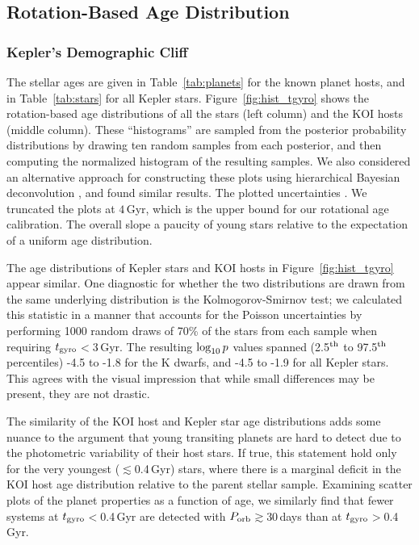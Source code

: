 \documentclass[11pt,twocolumn,tighten]{aastex63}
\begin{document}
\subsection{Rotation-Based Age Distribution}

\subsubsection{Kepler's Demographic Cliff}

The stellar ages are given in Table~\ref{tab:planets} for the known
planet hosts, and in Table~\ref{tab:stars} for all Kepler stars.
Figure~\ref{fig:hist_tgyro} shows the rotation-based age distributions
of all the stars (left column) and the KOI hosts (middle column).
These ``histograms'' are sampled from the posterior probability
distributions by drawing ten random samples from each posterior, and
then computing the normalized histogram of the resulting samples.
We also considered an alternative approach for constructing these
plots using hierarchical Bayesian deconvolution
\citep{Masuda2022infer}, and found similar results.  The plotted
uncertainties .  We truncated the plots
at $4$\,Gyr, which is the upper bound for our
rotational age calibration.  The overall slope  a paucity of
young stars relative to the expectation of a uniform age distribution.

The age distributions of Kepler stars and KOI hosts in
Figure~\ref{fig:hist_tgyro} appear similar.  One diagnostic for
whether the two distributions are drawn from the same underlying
distribution is the Kolmogorov-Smirnov test;  we calculated this
statistic in a manner that accounts for the Poisson uncertainties by
performing 1000 random draws of 70\% of the stars from each sample
when requiring $t_{\rm gyro}$$<$3\,Gyr.  The resulting $\log_{\rm
10}p$ values spanned (2.5$^{\rm th}$ to 97.5$^{\rm th}$ percentiles)
-4.5 to -1.8 for the K dwarfs, and -4.5 to -1.9 for all Kepler stars.
This agrees with the visual impression that while small differences
may be present, they are not drastic.

The similarity of the KOI host and Kepler star age distributions adds
some nuance to the argument that young transiting planets are hard to
detect due to the photometric variability of their host stars.  If
true, this statement  hold only for the very youngest
($\lesssim$0.4\,Gyr) stars, where there is a marginal deficit in the
KOI host age distribution relative to the parent stellar sample.
Examining scatter plots of the planet properties as a function of
age, we similarly find that fewer systems at $t_{\rm
gyro}$$<$0.4\,Gyr are detected with $P_{\rm orb}$$\gtrsim$30\,days
than at $t_{\rm gyro}$$>$0.4\,Gyr.
\end{document}
